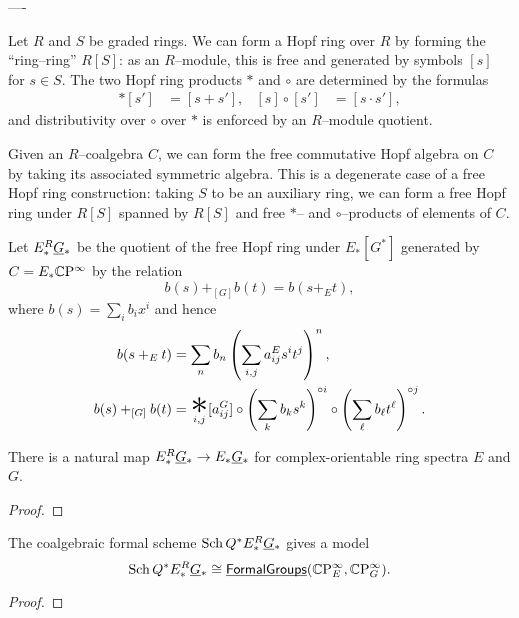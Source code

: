 ----


Let $R$ and $S$ be graded rings.  We can form a Hopf ring over $R$ by forming the ``ring--ring'' $R[S]$: as an $R$--module, this is free and generated by symbols $[s]$ for $s \in S$.  The two Hopf ring products $\ast$ and $\circ$ are determined by the formulas
\begin{align*}
[s] \ast [s'] & = [s + s'], &
[s] \circ [s'] & = [s \cdot s'],
\end{align*}
and distributivity over $\circ$ over $\ast$ is enforced by an $R$--module quotient.

Given an $R$--coalgebra $C$, we can form the free commutative Hopf algebra on $C$ by taking its associated symmetric algebra.  This is a degenerate case of a free Hopf ring construction: taking $S$ to be an auxiliary ring, we can form a free Hopf ring under $R[S]$ spanned by $R[S]$ and free $\ast$-- and $\circ$--products of elements of $C$.

\begin{definition}
Let $E_*^R \smash{\underline{G}}_{*}$ be the quotient of the free Hopf ring under $E_*[G^*]$ generated by $C = E_* \mathbb{C}\mathrm P^\infty$ by the relation \[b(s) +_{[G]} b(t) = b(s +_E t),\] where $b(s) = \sum_i b_i x^i$ and hence
\begin{align*}
b(s +_E t) & = \sum_n b_n \left(\sum_{i, j} a_{ij}^E s^i t^j \right)^n, \\
b(s) +_{[G]} b(t) & = \bigast_{i, j} [a_{ij}^G] \circ \left( \sum_k b_k s^k \right)^{\circ i} \circ \left( \sum_\ell b_\ell t^\ell \right)^{\circ j}.
\end{align*}
\end{definition}

\begin{lemma}
There is a natural map $E_*^R \smash{\underline{G}}_{*} \to E_* \smash{\underline{G}}_{*}$ for complex-orientable ring spectra $E$ and $G$.
\end{lemma}
\begin{proof}
\end{proof}

\begin{theorem}
The coalgebraic formal scheme $\operatorname{Sch} Q^* E_*^R \smash{\underline{G}}_{*}$ gives a model \[\operatorname{Sch} Q^* E_*^R \smash{\underline{G}}_{*} \cong \operatorname{\underline{\smash{\mathsf{FormalGroups}}}}(\mathbb{C}\mathrm P^\infty_E, \mathbb{C}\mathrm P^\infty_G).\]
\end{theorem}
\begin{proof}
\end{proof}

